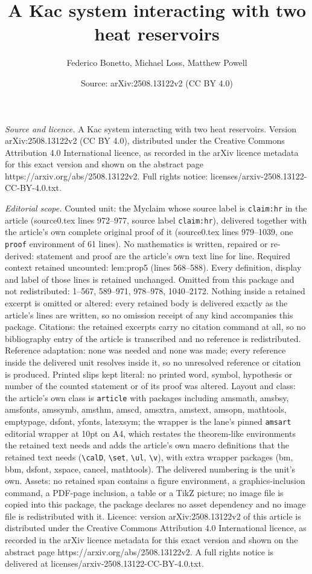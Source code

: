 \documentclass[10pt,a4paper]{amsart}
\title[A Kac system interacting with two heat reservoirs]{A Kac system interacting with two heat reservoirs}
\author{Federico Bonetto, Michael Loss, Matthew Powell}
\date{Source: arXiv:2508.13122v2 (CC BY 4.0)}
\begin{document}
\maketitle

\noindent\emph{Source and licence.} A Kac system interacting with two heat reservoirs. Version arXiv:2508.13122v2 (CC BY 4.0), distributed under the Creative Commons Attribution 4.0 International licence, as recorded in the arXiv licence metadata for this exact version and shown on the abstract page https://arxiv.org/abs/2508.13122v2. Full rights notice: licenses/arxiv-2508.13122-CC-BY-4.0.txt.\par\smallskip

\noindent\textit{Editorial scope.} Counted unit: the Myclaim whose source label is \texttt{claim:hr} in the article (source0.tex lines 972--977, source label \texttt{claim:hr}), delivered together with the article's own complete original proof of it (source0.tex lines 979--1039, one \texttt{proof} environment of 61 lines). No mathematics is written, repaired or re-derived: statement and proof are the article's own text line for line. Required context retained uncounted: lem:prop5 (lines 568--588). Every definition, display and label of those lines is retained unchanged. Omitted from this package and not redistributed: 1--567, 589--971, 978--978, 1040--2172. Nothing inside a retained excerpt is omitted or altered: every retained body is delivered exactly as the article's lines are written, so no omission receipt of any kind accompanies this package. Citations: the retained excerpts carry no citation command at all, so no bibliography entry of the article is transcribed and no reference is redistributed. Reference adaptation: none was needed and none was made; every reference inside the delivered unit resolves inside it, so no unresolved reference or citation is produced. Printed slips kept literal: no printed word, symbol, hypothesis or number of the counted statement or of its proof was altered. Layout and class: the article's own class is \texttt{article} with packages including amsmath, amsbsy, amsfonts, amssymb, amsthm, amscd, amsxtra, amstext, amsopn, mathtools, emptypage, dsfont, yfonts, latexsym; the wrapper is the lane's pinned \texttt{amsart} editorial wrapper at 10pt on A4, which restates the theorem-like environments the retained text needs and adds the article's own macro definitions that the retained text needs (\texttt{\textbackslash calD}, \texttt{\textbackslash set}, \texttt{\textbackslash ul}, \texttt{\textbackslash v}), with extra wrapper packages (bm, bbm, dsfont, xspace, cancel, mathtools). The delivered numbering is the unit's own. Assets: no retained span contains a figure environment, a graphics-inclusion command, a PDF-page inclusion, a table or a TikZ picture; no image file is copied into this package, the package declares no asset dependency and no image file is redistributed with it. Licence: version arXiv:2508.13122v2 of this article is distributed under the Creative Commons Attribution 4.0 International licence, as recorded in the arXiv licence metadata for this exact version and shown on the abstract page https://arxiv.org/abs/2508.13122v2. A full rights notice is delivered at licenses/arxiv-2508.13122-CC-BY-4.0.txt. 
\end{document}

